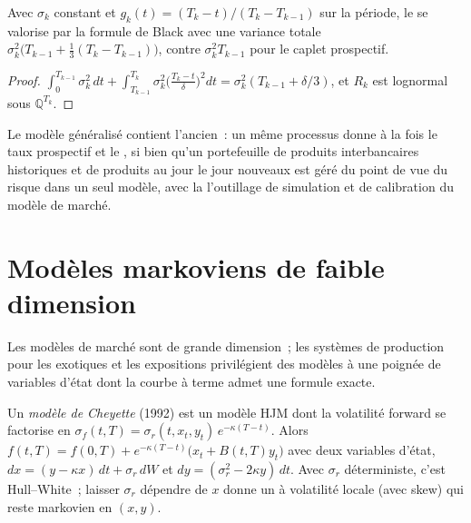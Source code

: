 \begin{proposition}\label{prop:rc:modelling-overnight-rate-products:gfmm}
Avec $\sigma_k$ constant et $g_k(t) = (T_k-t)/(T_k-T_{k-1})$ sur la période, le
 se valorise par la formule de Black avec une variance totale
$\sigma_k^2\bigl(T_{k-1}+\tfrac13(T_k-T_{k-1})\bigr)$, contre $\sigma_k^2T_{k-1}$ pour le
caplet prospectif.
\end{proposition}
\begin{proof}
$\int_0^{T_{k-1}}\sigma_k^2\,dt+\int_{T_{k-1}}^{T_k}\sigma_k^2\bigl(\frac{T_k-t}{\delta}\bigr)^2dt =
\sigma_k^2(T_{k-1}+\delta/3)$, et $R_k$ est lognormal sous $\mathbb Q^{T_k}$.
\end{proof}

Le modèle généralisé contient l'ancien~: un même processus donne à la fois le
taux prospectif et le , si bien qu'un portefeuille de produits interbancaires historiques
et de produits au jour le jour nouveaux est géré du point de vue du risque dans un seul modèle, avec la
l'outillage de simulation et de calibration du modèle de marché.

\section{Modèles markoviens de faible dimension}

Les modèles de marché sont de grande dimension~; les systèmes de production pour les exotiques et
les expositions privilégient des modèles à une poignée de variables d'état dont la courbe à terme
admet une formule exacte.

\begin{definition}\label{def:rc:modelling-overnight-rate-products:cheyette}
Un \emph{modèle de Cheyette} (1992) est un modèle HJM dont la volatilité forward
se factorise en $\sigma_f(t,T) = \sigma_r(t,x_t,y_t)\,e^{-\kappa(T-t)}$. Alors
$f(t,T) = f(0,T)+e^{-\kappa(T-t)}\bigl(x_t+B(t,T)y_t\bigr)$ avec deux variables d'état,
$dx = (y-\kappa x)\,dt+\sigma_r\,dW$ et $dy = (\sigma_r^2-2\kappa y)\,dt$. Avec
$\sigma_r$ déterministe, c'est Hull--White~; laisser $\sigma_r$ dépendre de $x$ donne un
 à volatilité locale (avec skew) qui reste markovien en $(x,y)$.
\end{definition}


